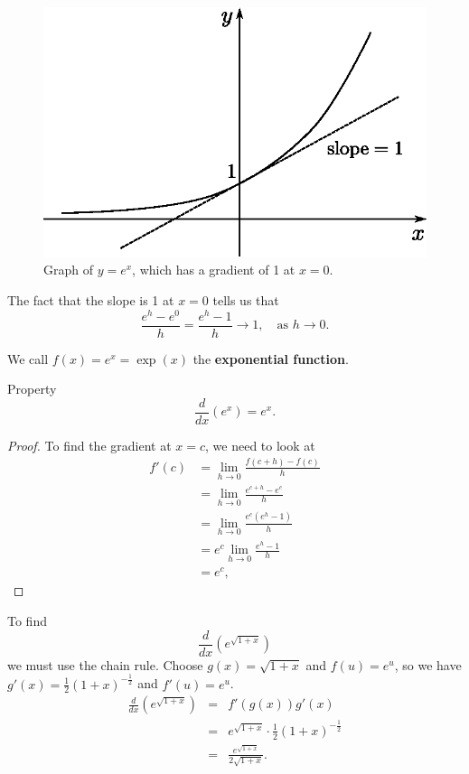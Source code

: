 \begin{figure}[H]
\centering
\includegraphics[scale=0.8]{img/graph-exp-x}
\captionstyle{\centering\it}
\caption{Graph of $y=e^x$, which has a gradient of 1 at $x=0$.}
\label{fig:graph-exp-x}
\end{figure}


The fact that the slope is 1 at $x=0$ tells us that
\[\frac{e^h-e^0}{h}=\frac{e^h-1}{h}\to1,\quad \text{as }h\to0.\]

\begin{definition}
We call $f(x)=e^x=\exp(x)$ the \textbf{exponential function}.
\end{definition}

\begin{thing}{Property}
\[\frac{d}{dx}(e^x)=e^x.\]
\begin{proof}
To find the gradient at $x=c$, we need to look at
\begin{align*}
f'(c)&=\lim_{h\to0}\frac{f(c+h)-f(c)}{h}\\
&=\lim_{h\to0}\frac{e^{c+h}-e^c}{h}\\
&=\lim_{h\to0}\frac{e^c(e^h-1)}{h}\\
&=e^c\lim_{h\to0}\frac{e^h-1}{h}\\
&=e^c,\end{align*}
\end{proof}
\end{thing}

\begin{example}
To find $$\frac{d}{dx}\left(e^{\sqrt{1+x}}\right)$$ we must use the chain rule. Choose $g(x)=\sqrt{1+x}$ and $f(u)=e^u$, so we have $g'(x)=\frac{1}{2}(1+x)^{-\frac{1}{2}}$ and $f'(u)=e^u$.
\begin{eqnarray*}
\frac{d}{dx}\left(e^{\sqrt{1+x}}\right) &=& f'(g(x))g'(x) \\
&=& e^{\sqrt{1+x}}\cdot\frac{1}{2}(1+x)^{-\frac{1}{2}} \\
&=& \frac{e^{\sqrt{1+x}}}{2\sqrt{1+x}}.
\end{eqnarray*}
\end{example}

